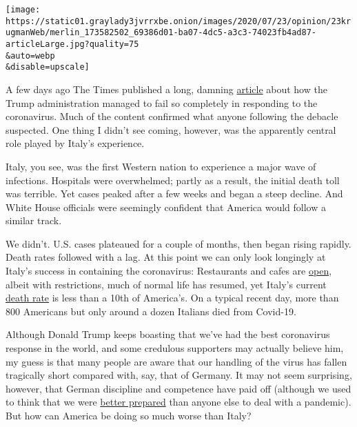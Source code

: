 \texttt{[image: https://static01.graylady3jvrrxbe.onion/images/2020/07/23/opinion/23krugmanWeb/merlin\_173582502\_69386d01-ba07-4dc5-a3c3-74023fb4ad87-articleLarge.jpg?quality=75\\\&auto=webp\\\&disable=upscale]}

A few days ago The Times published a long, damning
\href{https://www.nytimes3xbfgragh.onion/2020/07/18/us/politics/trump-coronavirus-response-failure-leadership.html}{article}
about how the Trump administration managed to fail so completely in
responding to the coronavirus. Much of the content confirmed what anyone
following the debacle suspected. One thing I didn't see coming, however,
was the apparently central role played by Italy's experience.

Italy, you see, was the first Western nation to experience a major wave
of infections. Hospitals were overwhelmed; partly as a result, the
initial death toll was terrible. Yet cases peaked after a few weeks and
began a steep decline. And White House officials were seemingly
confident that America would follow a similar track.

We didn't. U.S. cases plateaued for a couple of months, then began
rising rapidly. Death rates followed with a lag. At this point we can
only look longingly at Italy's success in containing the coronavirus:
Restaurants and cafes are
\href{https://www.washingtonpost.com/travel/2020/06/20/rome-is-ready-visitors-again-its-famous-restaurants-cafes-look-little-different/}{open},
albeit with restrictions, much of normal life has resumed, yet Italy's
current
\href{https://ourworldindata.org/coronavirus-data-explorer?zoomToSelection=true\&casesMetric=true\&dailyFreq=true\&perCapita=true\&smoothing=7\&country=USA~ITA\&pickerMetric=location\&pickerSort=asc}{death
rate} is less than a 10th of America's. On a typical recent day, more
than 800 Americans but only around a dozen Italians died from Covid-19.

Although Donald Trump keeps boasting that we've had the best coronavirus
response in the world, and some credulous supporters may actually
believe him, my guess is that many people are aware that our handling of
the virus has fallen tragically short compared with, say, that of
Germany. It may not seem surprising, however, that German discipline and
competence have paid off (although we used to think that we were
\href{https://www.washingtonpost.com/health/2019/10/24/none-these-countries-us-included-is-fully-prepared-pandemic-report-says/}{better
prepared} than anyone else to deal with a pandemic). But how can America
be doing so much worse than Italy?

